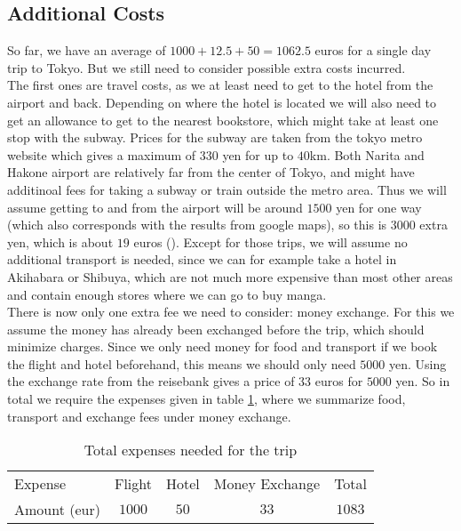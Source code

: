 \documentclass{article}
\begin{document}
\subsection{Additional Costs}
So far, we have an average of $1000+12.5+50=1062.5$ euros for a single day trip to Tokyo. 
But we still need to consider possible extra costs incurred. \\
The first ones are travel costs, as we at least need to get to the hotel from the airport and back.
Depending on where the hotel is located we will also need to get an allowance to get to the nearest bookstore, which might take at least one stop with the subway. 
Prices for the subway are taken from the tokyo metro website \cite{sub} which gives a maximum of $330$ yen for up to $40$km.
Both Narita and Hakone airport are relatively far from the center of Tokyo, and might have additinoal fees for taking a subway or train outside the metro area.
Thus we will assume getting to and from the airport will be around $1500$ yen for one way (which also corresponds with the results from google maps), so this is $3000$ extra yen, which is about $19$ euros (\cite{yen}).
Except for those trips, we will assume no additional transport is needed, since we can for example take a hotel in Akihabara or Shibuya, which are not much more expensive than most other areas and contain enough stores where we can go to buy manga.\\

There is now only one extra fee we need to consider: money exchange.
For this we assume the money has already been exchanged before the trip, which should minimize charges.
Since we only need money for food and transport if we book the flight and hotel beforehand, this means we should only need $5000$ yen.
Using the exchange rate from the reisebank \cite{change} gives a price of $33$ euros for $5000$ yen. 
So in total we require the expenses given in table \ref{tab:expenses}, where we summarize food, transport and exchange fees under money exchange.

\begin{table}[h]
        \centering
        \begin{tabular}{l c c c c}
                Expense & Flight & Hotel & Money Exchange & Total \\
                Amount (eur) & $1000$ & $50$  & $33$ & $1083$
        \end{tabular}
        \caption{Total expenses needed for the trip}
        \label{tab:expenses}
\end{table}
\end{document}

